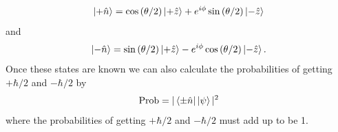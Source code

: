\documentclass[twocolumn]{article}
\begin{document}
\begin{equation}
\ket{+\hat{n}}=\cos{(\theta/2)}\ket{+\hat{z}}+e^{i\phi}\sin{(\theta/2)}\ket{-\hat{z}}
\end{equation}
and
\begin{equation}
\ket{-\hat{n}}=\sin{(\theta/2)}\ket{+\hat{z}}-e^{i\phi}\cos{(\theta/2)}\ket{-\hat{z}}.
\end{equation}
Once these states are known we can also calculate the probabilities of getting $+\hbar/2$ and $-\hbar/2$ by
\begin{equation}
\text{Prob}=|\bra{\pm\hat{n}}\ket{\psi}|^2
\end{equation}
where the probabilities of getting $+\hbar/2$ and $-\hbar/2$ must add up to be 1.
\end{document}

